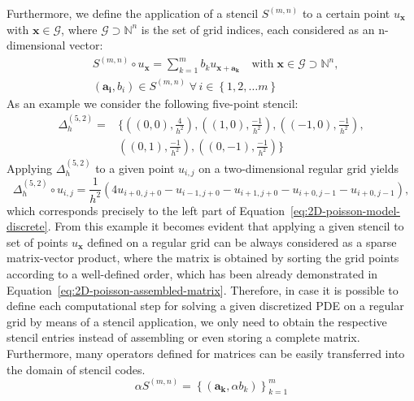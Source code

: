 Furthermore, we define the application of a stencil $S^{(m, n)}$ to a certain point $u_{\bm x}$ with $\bm x \in \mathcal G$, where $\mathcal G \supset \mathbb{N}^n$ is the set of grid indices, each considered as an n-dimensional vector:
\begin{equation}
	\begin{split}
		& S^{(m, n)} \circ u_{\bm x} = \sum_{k=1}^m b_k u_{\bm x + \bm{a_k}} \quad 
		\text{with} \; \bm{x} \in \mathcal G \supset \mathbb{N}^n, \\ & \left(\bm{a_i}, b_i\right) \in S^{(m,n)} \; \forall \, i \in \left\{ 1, 2, \dots m \right\} 
	\end{split}
\end{equation}
As an example we consider the following five-point stencil:
\begin{equation}
	\begin{split}
		\Delta_h^{(5,2)} = & \bigg\{ \left( \left( 0,0 \right), \frac{4}{h^2}\right), \left(\left(1,0\right), \frac{-1}{h^2}\right), \left(\left(-1,0\right), \frac{-1}{h^2}\right), \\ & \left(\left(0,1\right), \frac{-1}{h^2}\right), \left(\left(0,-1\right), \frac{-1}{h^2}\right) \bigg\}
	\end{split}
\end{equation}
Applying $\Delta_{h}^{(5,2)}$ to a given point $u_{i,j}$ on a two-dimensional regular grid yields 
\begin{equation}
	\Delta_h^{(5,2)} \circ u_{i,j} = \frac{1}{h^2}(4 u_{i+0,j+0}  - u_{i-1,j+0} - u_{i+1,j+0} - u_{i+0,j-1} - u_{i+0,j-1}),
\end{equation}
which corresponds precisely to the left part of Equation~\eqref{eq:2D-poisson-model-discrete}.
From this example it becomes evident that applying a given stencil to set of points $u_{\bm x}$ defined on a regular grid can be always considered as a sparse matrix-vector product, where the matrix is obtained by sorting the grid points according to a well-defined order, which has been already demonstrated in Equation~\eqref{eq:2D-poisson-assembled-matrix}.
Therefore, in case it is possible to define each computational step for solving a given discretized PDE on a regular grid by means of a stencil application, we only need to obtain the respective stencil entries instead of assembling or even storing a complete matrix.
Furthermore, many operators defined for matrices can be easily transferred into the domain of stencil codes.
\begin{equation}
	\alpha S^{(m, n)} = \left\{\left(\bm{a_k}, \alpha b_k\right) \right\}_{k=1}^m
\end{equation}
